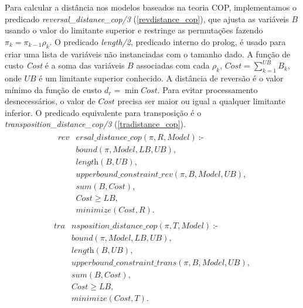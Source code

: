 Para calcular a distância nos modelos baseados na teoria COP,
implementamos o predicado \textit{reversal\_distance\_cop/3}
(\ref{revdistance_cop}), que ajusta as variáveis $B$ usando o valor do
limitante superior e restringe as permutações fazendo $\pi_{k}
= \pi_{k-1} \rho_{k}$. O predicado \textit{length/2}, predicado
interno do prolog, é usado para criar uma lista de variáveis não
instanciadas com o tamanho dado. A função de custo \textit{Cost} é a
soma das variáveis $B$ associadas com cada $\rho_{k}$, $Cost
= \sum_{k=1}^{UB} B_{k}$, onde $UB$ é um limitante superior
conhecido. A distância de reversão é o valor mínimo da função de custo
$d_{r} = \min Cost$. Para evitar processamento desnecessários, o valor
de $Cost$ precisa ser maior ou igual a qualquer limitante inferior. O
predicado equivalente para transposição é
o \textit{transposition\_distance\_cop/3} (\ref{tradistance_cop}).
\begin{align}
  \label{revdistance_cop}
  \begin{split}
  \textit{rev}&\textit{ersal\_distance\_cop}(\pi, R, Model)~\text{:-} \\
  &\textit{bound}(\pi, Model, LB, UB), \\
  &\textit{length}(B, UB),  \\
  &\textit{upperbound\_constraint\_rev}(\pi, B, Model, UB), \\
  &\textit{sum}(B, Cost),  \\
  &\textit{Cost} \ge \textit{LB},  \\
  &\textit{minimize}(Cost, R). 
  \end{split}
\end{align}
\begin{align}
  \label{tradistance_cop}
  \begin{split}
  \textit{tra}&\textit{nsposition\_distance\_cop}(\pi, T, Model)~\text{:-} \\
  &\textit{bound}(\pi, Model, LB, UB), \\
  &\textit{length}(B, UB),  \\
  &\textit{upperbound\_constraint\_trans}(\pi, B, Model, UB), \\
  &\textit{sum}(B, Cost),  \\
  &\textit{Cost} \ge \textit{LB},  \\
  &\textit{minimize}(Cost, T). 
  \end{split}
\end{align}

